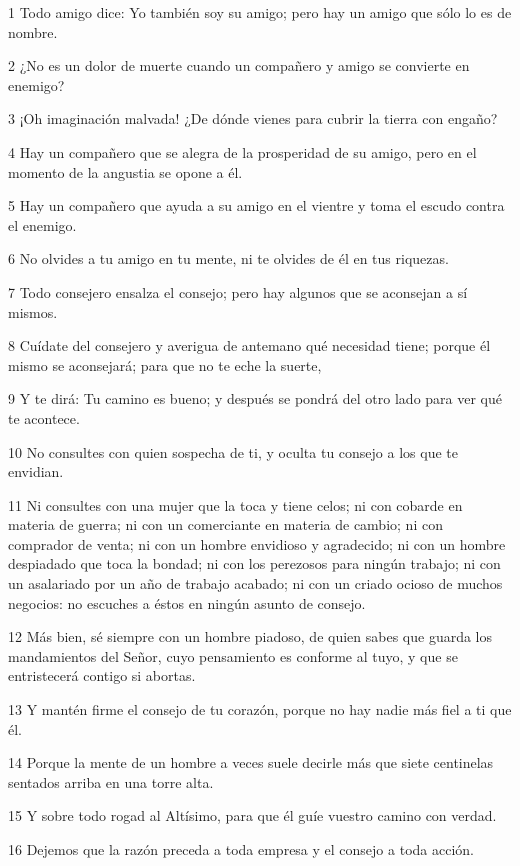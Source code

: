 \par 1 Todo amigo dice: Yo también soy su amigo; pero hay un amigo que sólo lo es de nombre.
\par 2 ¿No es un dolor de muerte cuando un compañero y amigo se convierte en enemigo?
\par 3 ¡Oh imaginación malvada! ¿De dónde vienes para cubrir la tierra con engaño?
\par 4 Hay un compañero que se alegra de la prosperidad de su amigo, pero en el momento de la angustia se opone a él.
\par 5 Hay un compañero que ayuda a su amigo en el vientre y toma el escudo contra el enemigo.
\par 6 No olvides a tu amigo en tu mente, ni te olvides de él en tus riquezas.
\par 7 Todo consejero ensalza el consejo; pero hay algunos que se aconsejan a sí mismos.
\par 8 Cuídate del consejero y averigua de antemano qué necesidad tiene; porque él mismo se aconsejará; para que no te eche la suerte,
\par 9 Y te dirá: Tu camino es bueno; y después se pondrá del otro lado para ver qué te acontece.
\par 10 No consultes con quien sospecha de ti, y oculta tu consejo a los que te envidian.
\par 11 Ni consultes con una mujer que la toca y tiene celos; ni con cobarde en materia de guerra; ni con un comerciante en materia de cambio; ni con comprador de venta; ni con un hombre envidioso y agradecido; ni con un hombre despiadado que toca la bondad; ni con los perezosos para ningún trabajo; ni con un asalariado por un año de trabajo acabado; ni con un criado ocioso de muchos negocios: no escuches a éstos en ningún asunto de consejo.
\par 12 Más bien, sé siempre con un hombre piadoso, de quien sabes que guarda los mandamientos del Señor, cuyo pensamiento es conforme al tuyo, y que se entristecerá contigo si abortas.
\par 13 Y mantén firme el consejo de tu corazón, porque no hay nadie más fiel a ti que él.
\par 14 Porque la mente de un hombre a veces suele decirle más que siete centinelas sentados arriba en una torre alta.
\par 15 Y sobre todo rogad al Altísimo, para que él guíe vuestro camino con verdad.
\par 16 Dejemos que la razón preceda a toda empresa y el consejo a toda acción.

